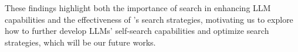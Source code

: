 
These findings highlight both the importance of search in enhancing LLM capabilities and the effectiveness of \method's search strategies, motivating us to explore how to further develop LLMs' self-search capabilities and optimize search strategies, which will be our future works. 


